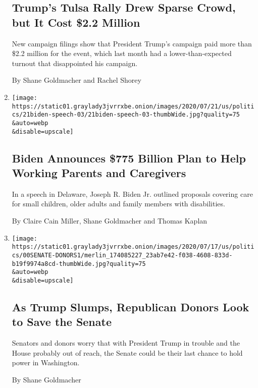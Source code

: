 \begin{enumerate}
{  \subsection{Trump's Tulsa Rally Drew Sparse Crowd, but It Cost \$2.2
  Million}\label{trumps-tulsa-rally-drew-sparse-crowd-but-it-cost-22-million}}

  New campaign filings show that President Trump's campaign paid more
  than \$2.2 million for the event, which last month had a
  lower-than-expected turnout that disappointed his campaign.

  By Shane Goldmacher and Rachel Shorey
\item
  \href{/2020/07/21/us/politics/biden-workplace-childcare.html}{}

  \texttt{[image: https://static01.graylady3jvrrxbe.onion/images/2020/07/21/us/politics/21biden-speech-03/21biden-speech-03-thumbWide.jpg?quality=75\\\&auto=webp\\\&disable=upscale]}

  \hypertarget{biden-announces-775-billion-plan-to-help-working-parents-and-caregivers}{%
  \subsection{Biden Announces \$775 Billion Plan to Help Working Parents
  and
  Caregivers}\label{biden-announces-775-billion-plan-to-help-working-parents-and-caregivers}}

  In a speech in Delaware, Joseph R. Biden Jr. outlined proposals
  covering care for small children, older adults and family members with
  disabilities.

  By Claire Cain Miller, Shane Goldmacher and Thomas Kaplan
\item
  \href{/2020/07/20/us/politics/trump-polls-senate.html}{}

  \texttt{[image: https://static01.graylady3jvrrxbe.onion/images/2020/07/17/us/politics/00SENATE-DONORS1/merlin\_174085227\_23ab7e42-f038-4608-833d-b19f9974a8cd-thumbWide.jpg?quality=75\\\&auto=webp\\\&disable=upscale]}

  \hypertarget{as-trump-slumps-republican-donors-look-to-save-the-senate}{%
  \subsection{As Trump Slumps, Republican Donors Look to Save the
  Senate}\label{as-trump-slumps-republican-donors-look-to-save-the-senate}}

  Senators and donors worry that with President Trump in trouble and the
  House probably out of reach, the Senate could be their last chance to
  hold power in Washington.

  By Shane Goldmacher
\end{enumerate}

